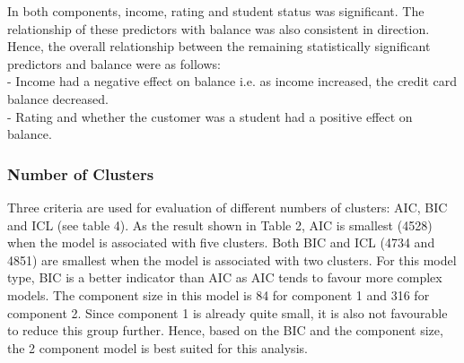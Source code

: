 \documentclass[12pt]{article}
\begin{document}
{In both components, income, rating and student status was significant. The relationship of these predictors with balance was also consistent in direction. Hence, the overall relationship between the remaining statistically significant predictors and balance were as follows:\\
- Income had a negative effect on balance i.e. as income increased, the credit card balance decreased.\\
- Rating and whether the customer was a student had a positive effect on balance. 

\subsubsection*{Number of Clusters}
Three criteria are used for evaluation of different numbers of clusters: AIC, BIC and ICL (see table 4). As the result shown in Table 2, AIC is smallest (4528) when the model is associated with five clusters. Both BIC and ICL (4734 and 4851) are smallest when the model is associated with two clusters. For this model type, BIC is a better indicator than AIC as AIC tends to favour more complex models. The component size in this model is 84 for component 1 and 316 for component 2. Since component 1 is already quite small, it is also not favourable to reduce this group further. Hence, based on the BIC and the component size, the 2 component model is best suited for this analysis.
\begin{table}[H] \centering 
  \caption{Component 1} 
  \label{} 
\end{table}}
\end{document}
